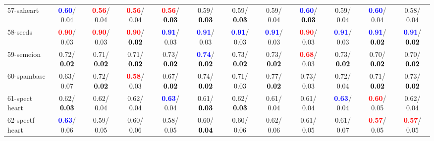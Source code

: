 \begin{table}[h]
\begin{center}
{\begin{tabular}{lc|c|c|c|c|c|c|c|c|c|c}
57-saheart & \textcolor{blue}{\textbf{  0.60}}/  0.04 & \textcolor{red}{\textbf{  0.56}}/  0.04 & \textcolor{red}{\textbf{  0.56}}/  0.04 & \textcolor{red}{\textbf{  0.56}}/\textcolor{black}{\textbf{  0.03}} &   0.59/\textcolor{black}{\textbf{  0.03}} &   0.59/\textcolor{black}{\textbf{  0.03}} &   0.59/  0.04 & \textcolor{blue}{\textbf{  0.60}}/\textcolor{black}{\textbf{  0.03}} &   0.59/  0.04 & \textcolor{blue}{\textbf{  0.60}}/  0.04 &   0.58/  0.04 \\
58-seeds & \textcolor{red}{\textbf{  0.90}}/  0.03 & \textcolor{red}{\textbf{  0.90}}/  0.03 & \textcolor{red}{\textbf{  0.90}}/\textcolor{black}{\textbf{  0.02}} & \textcolor{blue}{\textbf{  0.91}}/  0.03 & \textcolor{blue}{\textbf{  0.91}}/  0.03 & \textcolor{blue}{\textbf{  0.91}}/  0.03 & \textcolor{blue}{\textbf{  0.91}}/  0.03 & \textcolor{red}{\textbf{  0.90}}/  0.03 & \textcolor{blue}{\textbf{  0.91}}/  0.03 & \textcolor{blue}{\textbf{  0.91}}/\textcolor{black}{\textbf{  0.02}} & \textcolor{blue}{\textbf{  0.91}}/\textcolor{black}{\textbf{  0.02}} \\
59-semeion &   0.72/\textcolor{black}{\textbf{  0.02}} &   0.71/\textcolor{black}{\textbf{  0.02}} &   0.71/\textcolor{black}{\textbf{  0.02}} &   0.73/\textcolor{black}{\textbf{  0.02}} & \textcolor{blue}{\textbf{  0.74}}/\textcolor{black}{\textbf{  0.02}} &   0.73/\textcolor{black}{\textbf{  0.02}} &   0.73/\textcolor{black}{\textbf{  0.02}} & \textcolor{red}{\textbf{  0.68}}/  0.03 &   0.73/\textcolor{black}{\textbf{  0.02}} &   0.70/\textcolor{black}{\textbf{  0.02}} &   0.70/\textcolor{black}{\textbf{  0.02}} \\
60-spambase &   0.63/  0.07 &   0.72/\textcolor{black}{\textbf{  0.02}} & \textcolor{red}{\textbf{  0.58}}/  0.03 &   0.67/\textcolor{black}{\textbf{  0.02}} &   0.74/\textcolor{black}{\textbf{  0.02}} &   0.71/  0.03 &   0.77/\textcolor{black}{\textbf{  0.02}} &   0.73/  0.03 &   0.72/  0.04 &   0.71/\textcolor{black}{\textbf{  0.02}} &   0.73/\textcolor{black}{\textbf{  0.02}} \\ \hline
61-spect heart &   0.62/\textcolor{black}{\textbf{  0.03}} &   0.62/  0.04 &   0.62/  0.04 & \textcolor{blue}{\textbf{  0.63}}/  0.04 &   0.61/\textcolor{black}{\textbf{  0.03}} &   0.62/\textcolor{black}{\textbf{  0.03}} &   0.61/  0.04 &   0.61/  0.04 & \textcolor{blue}{\textbf{  0.63}}/  0.04 & \textcolor{red}{\textbf{  0.60}}/  0.05 &   0.62/  0.04 \\
62-spectf heart & \textcolor{blue}{\textbf{  0.63}}/  0.06 &   0.59/  0.05 &   0.60/  0.06 &   0.58/  0.05 &   0.60/\textcolor{black}{\textbf{  0.04}} &   0.60/  0.06 &   0.62/  0.06 &   0.61/  0.05 &   0.61/  0.07 & \textcolor{red}{\textbf{  0.57}}/  0.05 & \textcolor{red}{\textbf{  0.57}}/  0.05 \\

\end{tabular}}
\end{center}
\end{table}
